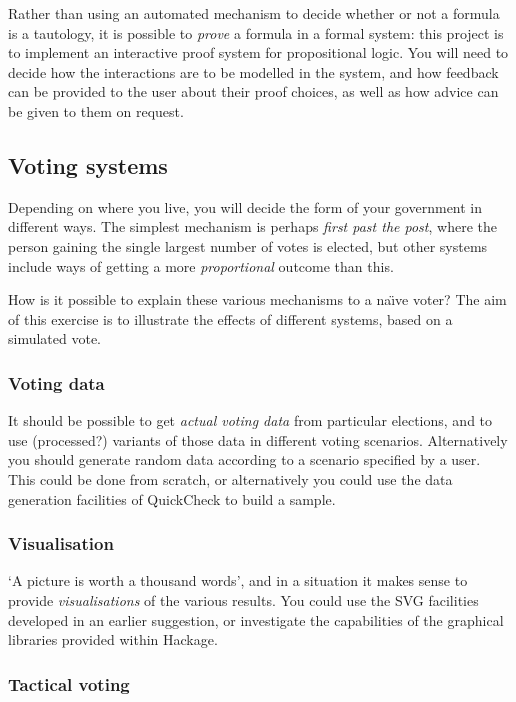 Rather than using an automated mechanism to decide whether or not a formula is a tautology, it is possible to \emph{prove} a formula in a formal system: this project is to implement an interactive proof system for propositional logic. You will need to decide how the interactions are to be modelled in the system, and how feedback can be provided to the user about their proof choices, as well as how advice can be given to them on request.

\subsection*{Voting systems}

Depending on where you live, you will decide the form of your government in different ways. The simplest mechanism is perhaps \emph{first past the post}, where the person gaining the single largest number of votes is elected, but other systems include ways of getting a more \emph{proportional} outcome than this. 

How is it possible to explain these various mechanisms to a na\"\i{}ve voter?
The aim of this exercise is to illustrate the effects of different systems, based on a simulated vote.

\subsubsection*{Voting data}

It should be possible to get \emph{actual voting data} from particular elections, and to use (processed?) variants of those data in different voting scenarios. Alternatively you should generate random data according to a scenario specified by a user. This could be done from scratch, or alternatively you could use the data generation facilities of QuickCheck to build a sample.

\subsubsection*{Visualisation}

`A picture is worth a thousand words', and in a situation it makes sense to provide \emph{visualisations} of the various results. You could use the SVG facilities developed in an earlier suggestion, or investigate the capabilities of the graphical libraries provided within Hackage.

\subsubsection*{Tactical voting}

